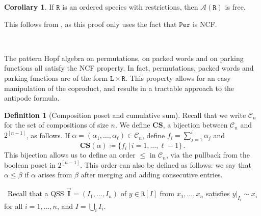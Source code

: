 \documentclass[12pt, reqno]{amsart}
\theoremstyle{definition}
\newtheorem{cor}[thm]{Corollary}
\newtheorem{defin}[thm]{Definition}
\newcommand{\III}{\vec{\mathbf{I}}}
\begin{document}
\begin{cor}\label{cor:freeNCF}
If $\mathtt{R}$ is an ordered species with restrictions, then $\mathcal A(\mathtt{R})$ is free.
\end{cor}
This follows from \cite[Theorem 5.2]{Vargas}, as this proof only uses the fact that $\mathtt{Per}$ is NCF.

\

The pattern Hopf algebra on permutations, on packed words and on parking functions all satisfy the NCF property.
In fact, permutations, packed words and parking functions are of the form $\mathtt{L} \times \mathtt{R}$.
This property allows for an easy manipulation of the coproduct, and results in a tractable approach to the antipode formula.

\begin{defin}[Composition poset and cumulative sum]
Recall that we write $\mathcal C_n$ for the set of compositions of size $n$.
We define $\mathbf{CS}$, a bijection between $\mathcal C_n $ and $2^{[n-1]}$, as follows.
If $\alpha =(\alpha_1, \dots, \alpha_{\ell} ) \in \mathcal C_n$, define $f_i = \sum_{j=1}^i \alpha_j$ and 
\begin{equation}
    \mathbf{CS}(\alpha) \coloneqq \{f_i\, | \, i = 1, \dots, \ell - 1\} \, .
\end{equation}
This bijection allows us to define an order $\leq $ in $\mathcal C_n$, via the pullback from the boolean poset in $2^{[n-1]}$.
This order can also be defined as follows: we say that $\alpha \leq \beta$ if $\alpha$ arises from $\beta $ after merging and adding consecutive entries.
\end{defin}

\
Recall that a QSS $\III = (I_1, \dots , I_n)$ of $y\in \mathtt{R}[I]$ from $x_1, \dots, x_n$ satisfies $y|_{I_i} \sim x_i$ for all $i = 1, \dots , n$, and $I = \bigcup_i I_i$.
\end{document}
